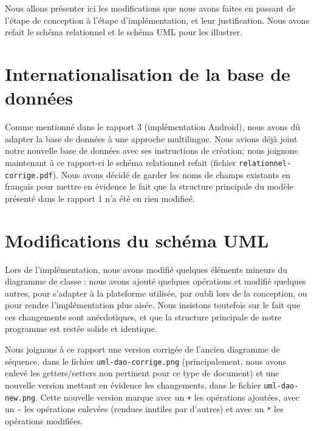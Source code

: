 \documentclass[a4paper,10pt]{article}
\begin{document}

Nous allons présenter ici les modifications que nous avons faites en passant de l'étape de conception à l'étape d'implémentation, et leur justification. Nous avons refait le schéma relationnel et le schéma UML pour les illustrer.

\section{Internationalisation de la base de données}

Comme mentionné dans le rapport 3 (implémentation Android), nous avons dû adapter la base de données à une approche multilingue.
Nous avions déjà joint notre nouvelle base de données avec ses instructions de création; nous joignons maintenant à ce rapport-ci le schéma relationnel refait (fichier \texttt{relationnel-corrige.pdf}). Nous avons décidé de garder les noms de champs existants en français pour mettre en évidence le fait que la structure principale du modèle présenté dans le rapport 1 n'a été en rien modifieé.

\section{Modifications du schéma UML}

Lors de l'implémentation, nous avons modifié quelques éléments mineurs du diagramme de classe : nous avons ajouté quelques opérations et modifié quelques autres, pour s'adapter à la plateforme utilisée, par oubli lors de la conception, ou pour rendre l'implémentation plus aisée. Nous insistons toutefois sur le fait que ces changements sont anécdotiques, et que la structure principale de notre programme est restée solide et identique.

Nous joignons à ce rapport une version corrigée de l'ancien diagramme de séquence, dans le fichier \texttt{uml-dao-corrige.png} (principalement, nous avons enlevé les getters/setters non pertinent pour ce type de document) et une nouvelle version mettant en évidence les changements, dans le fichier \texttt{uml-dao-new.png}. Cette nouvelle version marque avec un \texttt{+} les opérations ajoutées, avec un \texttt{-} les opérations enlevées (rendues inutiles par d'autres) et avec un \texttt{*} les opérations modifiées.
\end{document}
